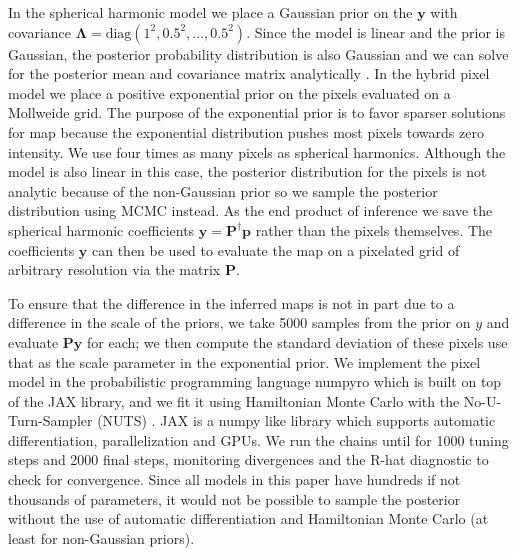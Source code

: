 \documentclass[modern]{aastex62}
\begin{document}
In the spherical harmonic model we place a Gaussian prior on the $\mathbf{y}$ with covariance $\boldsymbol{\Lambda}=\mathrm{diag}(1^2,0.5^2,\dots,0.5^2)$.
Since the model is linear and the prior is Gaussian, the posterior probability distribution is also Gaussian and we can solve for the posterior mean and covariance matrix analytically \citep{luger2019a}.
In the hybrid pixel model we place a positive exponential prior on the pixels evaluated on a Mollweide grid. 
The purpose of the exponential prior is to favor sparser solutions for map because the exponential distribution pushes most pixels towards zero intensity.
We use four times as many pixels as spherical harmonics.
Although the model is also linear in this case, the posterior distribution for the pixels is not analytic because of the non-Gaussian prior so we sample the posterior distribution using MCMC instead.
As the end product of inference we save the spherical harmonic coefficients $\mathbf{y}=\mathbf{P}^\dagger\mathbf{p}$ rather than the pixels themselves.
The coefficients $\mathbf{y}$ can then be used to evaluate the map on a pixelated grid of arbitrary resolution via the matrix $\mathbf{P}$. 

To ensure that the difference in the inferred maps is not in part due to a difference in the scale of the priors, we take 5000 samples from the prior on $y$ and evaluate $\mathbf{P}\mathbf{y}$ for each; we then compute the standard deviation of these pixels use that as the scale parameter in the exponential prior.
We implement the pixel model in the probabilistic programming language \textsf{numpyro} \citep{phan2019a} which is built on top of the \textsf{JAX} \citep{jax2018github} library, and we fit it using Hamiltonian Monte Carlo with the No-U-Turn-Sampler (NUTS) \citep{hoffman2014}.
\textsf{JAX} is a \textsf{numpy} like library which supports automatic differentiation, parallelization and GPUs.
We run the chains until for 1000 tuning steps and 2000 final steps, monitoring divergences \citep{betancourt2013} and the R-hat  diagnostic  \citep{gelman1992a} to check for convergence.
Since all models in this paper have hundreds if not thousands of parameters, it would not be possible to sample the posterior  without the use of automatic differentiation and Hamiltonian Monte Carlo (at least for non-Gaussian priors).
\end{document}
